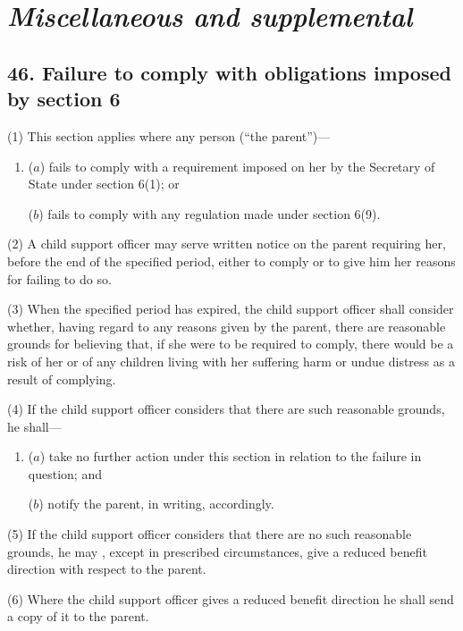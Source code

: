 \documentclass[12pt,a4paper]{article}
\begin{document}

\section{\itshape Miscellaneous and supplemental}

\subsection{46. Failure to comply with obligations imposed by section 6}

(1) This section applies where any person (“the parent”)—
\begin{enumerate}\item[]
($a$) fails to comply with a requirement imposed on her by the Secretary of State under section 6(1); or

($b$) fails to comply with any regulation made under section 6(9).
\end{enumerate}

(2) A child support officer may serve written notice on the parent requiring her, before the end of the specified period, either to comply or to give him her reasons for failing to do so.

(3) When the specified period has expired, the child support officer shall consider whether, having regard to any reasons given by the parent, there are reasonable grounds for believing that, if she were to be required to comply, there would be a risk of her or of any children living with her suffering harm or undue distress as a result of complying.

(4) If the child support officer considers that there are such reasonable grounds, he shall—
\begin{enumerate}\item[]
($a$) take no further action under this section in relation to the failure in question; and

($b$) notify the parent, in writing, accordingly.
\end{enumerate}

(5) If the child support officer considers that there are no such reasonable grounds, he may%
, except in prescribed circumstances,  %
give a reduced benefit direction with respect to the parent.

(6) Where the child support officer gives a reduced benefit direction he shall send a copy of it to the parent.
\end{document}
